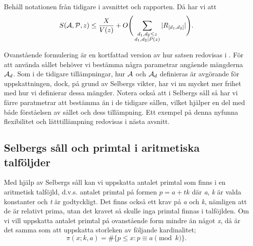 \begin{theorem}\label{sel.sieve.thm}
Behåll notationen från tidigare i avsnittet och rapporten. Då har vi att
\begin{equation}
    S(\mathcal{A}, \mathcal{P}, z) \leq \frac{X}{V(z)} + O\Bigg(\sum_{\substack{d_1,d_2\leq z\\d_1,d_2\mid P(z)}}|R_{[d_1, d_2]}|\Bigg).\nonumber
\end{equation}
\end{theorem}
Ovanstående formulering är en kortfattad version av hur satsen redovisas i \cite{cojocarumurty}. För att använda sållet behöver vi bestämma några parametrar angående mängderna \(\mathcal{A}_d\).
Som i de tidigare tillämpningar, hur \(\mathcal{A}\) och \(\mathcal{A}_d\) definieras är avgörande för uppskattningen, dock, på grund av Selbergs vikter, har vi nu mycket mer frihet med hur vi definierar dessa mängder. 
Notera också att i Selbergs såll så har vi färre paratmetrar att bestämma än i de tidigare sållen, vilket hjälper en del med både förståelsen av sållet och dess tillämpning. 
Ett exempel på denna nyfunna flexibilitet och lätttillämpning redovisas i nästa avsnitt.

\subsection{Selbergs såll och primtal i aritmetiska talföljder}

Med hjälp av Selbergs såll kan vi uppskatta antalet primtal som finns i en aritmetisk talföjld, d.v.s. antalet primtal på formen \(p = a + tk\) där \textit{a}, \textit{k} är valda konstanter och \textit{t} är godtyckligt. 
Det finns också ett krav på \textit{a} och \textit{k}, nämligen att de är relativt prima, utan det kravet så skulle inga primtal finnas i talföjlden. 
Om vi vill uppskatta antalet primtal på ovanstående form mindre än något \textit{x}, då är det samma som att uppskatta storleken av följande kardinalitet;
\begin{equation}
    \pi(x;k,a) = \#\{p\leq x: p \equiv a \pmod{k}\}.\label{sel.apl.arithPrimes}
\end{equation}


